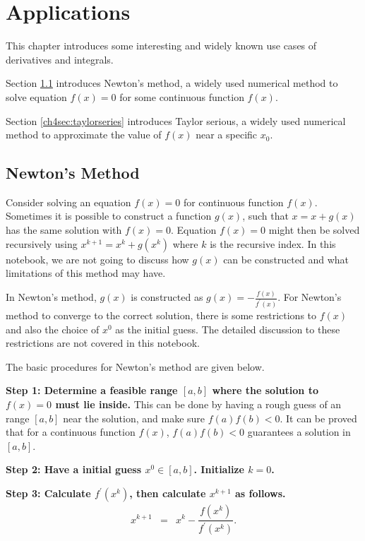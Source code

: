 \chapter{Applications}

This chapter introduces some interesting and widely known use cases of derivatives and integrals. 

Section \ref{ch4sec:newtonsmethod} introduces Newton's method, a widely used numerical method to solve equation $f(x) = 0$ for some continuous function $f(x)$. 

Section \ref{ch4sec:taylorseries} introduces Taylor serious, a widely used numerical method to approximate the value of $f(x)$ near a specific $x_0$.

\section{Newton's Method} \label{ch4sec:newtonsmethod}

Consider solving an equation $f(x)=0$ for continuous function $f(x)$. Sometimes it is possible to construct a function $g(x)$, such that $x= x + g(x)$ has the same solution with $f(x) = 0$. Equation $f(x)=0$ might then be solved recursively using $x^{k+1} = x^k + g(x^k)$ where $k$ is the recursive index. In this notebook, we are not going to discuss how $g(x)$ can be constructed and what limitations of this method may have.

In Newton's method, $g(x)$ is constructed as $g(x) = -\frac{f(x)}{f^\prime(x)}$. For Newton's method to converge to the correct solution, there is some restrictions to $f(x)$ and also the choice of $x^0$ as the initial guess. The detailed discussion to these restrictions are not covered in this notebook.

The basic procedures for Newton's method are given below.

\textbf{Step 1: Determine a feasible range $[a, b]$ where the solution to $f(x)=0$ must lie inside.} This can be done by having a rough guess of an range $[a, b]$ near the solution, and make sure $f(a)f(b)<0$. It can be proved that for a continuous function $f(x)$, $f(a)f(b)<0$ guarantees a solution in $[a, b]$.

\textbf{Step 2: Have a initial guess $x^0 \in [a, b]$. Initialize $k=0$.}

\textbf{Step 3: Calculate $f^\prime(x^k)$, then calculate $x^{k+1}$ as follows.}
\begin{eqnarray}
    x^{k+1} &=& x^k - \dfrac{f(x^k)}{f^\prime(x^k)}. \nonumber
\end{eqnarray}

